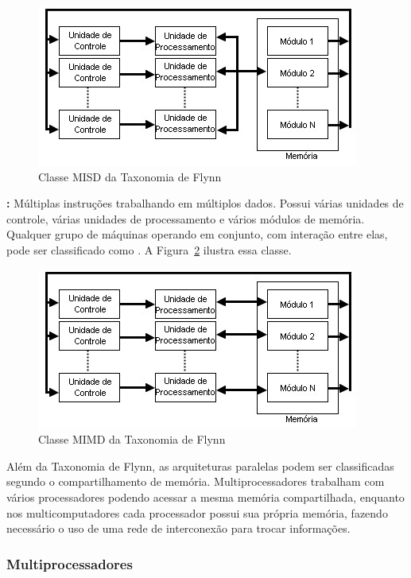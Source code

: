 \begin{figure}[t]
    \centering
    \includegraphics{Images/MISD.jpg}
    \caption{Classe MISD da Taxonomia de Flynn}\label{fig:misd}
\end{figure}

\textbf{\mimd:} Múltiplas instruções trabalhando em múltiplos dados. Possui várias unidades de controle, várias unidades de processamento e vários módulos de memória. Qualquer grupo de máquinas operando em conjunto, com interação entre elas, pode ser classificado como \mimd. A Figura~\ref{fig:mimd} ilustra essa classe.

\begin{figure}[t]
    \centering
    \includegraphics{Images/MIMD.jpg}
    \caption{Classe MIMD da Taxonomia de Flynn}\label{fig:mimd}
\end{figure}

Além da Taxonomia de Flynn, as arquiteturas paralelas podem ser classificadas segundo o compartilhamento de memória. Multiprocessadores trabalham com vários processadores podendo acessar a mesma memória compartilhada, enquanto nos multicomputadores cada processador possui sua própria memória, fazendo necessário o uso de uma rede de interconexão para trocar informações.

\subsubsection{Multiprocessadores}


